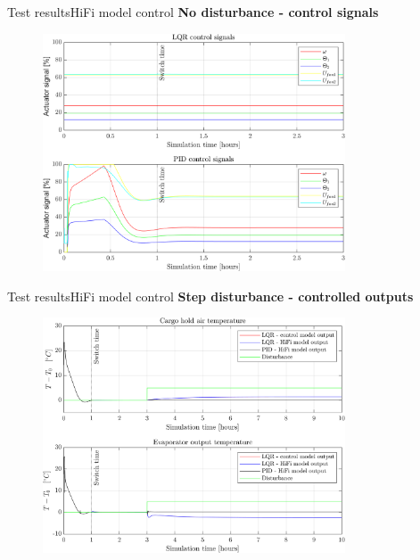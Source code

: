 
\begin{frame}{Test results}{HiFi model control}
	 \textbf{No disturbance - control signals}
	\begin{figure}[H]
		\centering
		\includegraphics[width=0.8\textwidth]{../Graphics/fig_inputs_noDist.png}
	\end{figure}
\end{frame}



\begin{frame}{Test results}{HiFi model control}
	\textbf{Step disturbance - controlled outputs}
	\begin{figure}[H]
		\centering
		\includegraphics[width=0.8\textwidth]{../Graphics/fig_LQRvsKresten_stepDist.png}
	\end{figure} 
\end{frame}



